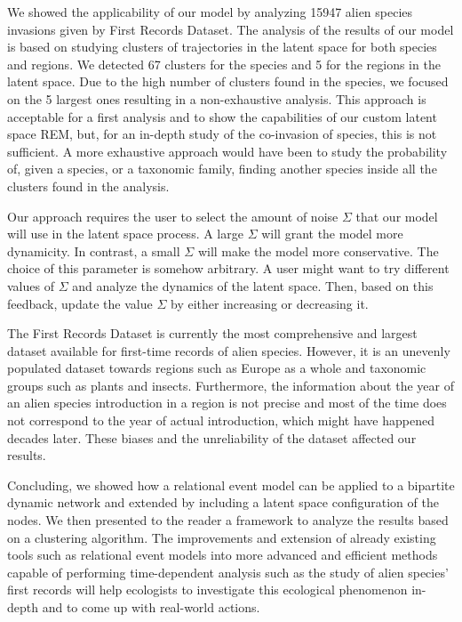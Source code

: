 \documentclass[mscthesis]{usiinfthesis}
\begin{document}
We showed the applicability of our model by analyzing 15947 alien species invasions given by First Records Dataset. The analysis of the results of our model is based on studying clusters of trajectories in the latent space for both species and regions. We detected 67 clusters for the species and 5 for the regions in the latent space. Due to the high number of clusters found in the species, we focused on the 5 largest ones resulting in a non-exhaustive analysis. This approach is acceptable for a first analysis and to show the capabilities of our custom latent space REM, but, for an in-depth study of the co-invasion of species, this is not sufficient. A more exhaustive approach would have been to study the probability of, given a species, or a taxonomic family, finding another species inside all the clusters found in the analysis. 
 
Our approach requires the user to select the amount of noise $\Sigma$ that our model will use in the latent space process. A large $\Sigma$ will grant the model more dynamicity. In contrast, a small $\Sigma$ will make the model more conservative. The choice of this parameter is somehow arbitrary. A user might want to try different values of $\Sigma$ and analyze the dynamics of the latent space. Then, based on this feedback, update the value $\Sigma$ by either increasing or decreasing it. 

The First Records Dataset is currently the most comprehensive and largest dataset available for first-time records of alien species. However, it is an unevenly populated dataset towards regions such as Europe as a whole and taxonomic groups such as plants and insects. Furthermore, the information about the year of an alien species introduction in a region is not precise and most of the time does not correspond to the year of actual introduction, which might have happened decades later. These biases and the unreliability of the dataset affected our results.

Concluding, we showed how a relational event model can be applied to a bipartite dynamic network and extended by including a latent space configuration of the nodes. We then presented to the reader a framework to analyze the results based on a clustering algorithm. The improvements and extension of already existing tools such as relational event models into more advanced and efficient methods capable of performing time-dependent analysis such as the study of alien species' first records will help ecologists to investigate this ecological phenomenon in-depth and to come up with real-world actions. 
\end{document}
